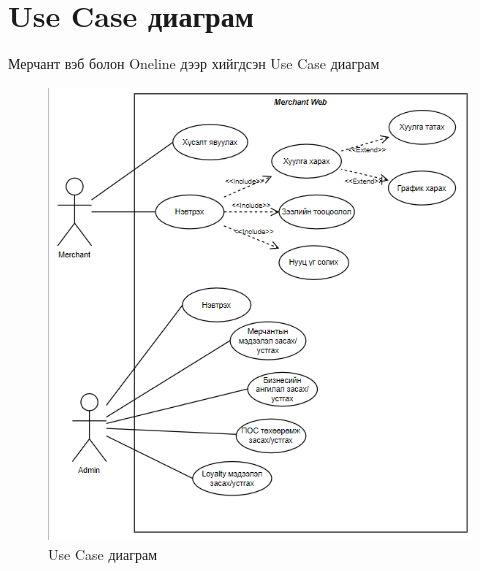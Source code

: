 \section{Use Case диаграм}
	Мерчант вэб болон Oneline дээр хийгдсэн Use Case диаграм
\begin{figure}
	\centering
	\includegraphics[width=13cm]{images/usecase.png}
	\caption{Use Case диаграм}
	\label{fig:form}
\end{figure}

